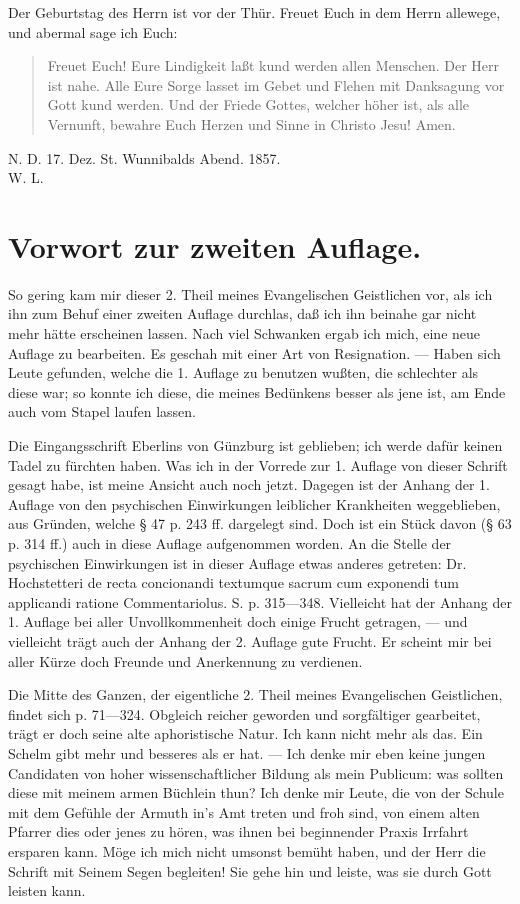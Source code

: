 Der Geburtstag des Herrn ist vor der Thür. Freuet Euch in dem Herrn allewege, und abermal sage ich Euch:

\begin{quote}
Freuet Euch! Eure Lindigkeit laßt kund werden allen Menschen. Der Herr ist nahe. Alle Eure Sorge lasset im Gebet und Flehen mit Danksagung vor Gott kund werden. Und der Friede Gottes, welcher höher ist, als alle Vernunft, bewahre Euch Herzen und Sinne in Christo Jesu! Amen.
\end{quote}

\begin{flushright}
N. D. 17. Dez. St. Wunnibalds Abend. 1857.\\[0.8em]
W. L.
\end{flushright}

\section*{Vorwort zur zweiten Auflage.}

So gering kam mir dieser 2. Theil meines Evangelischen Geistlichen vor, als ich ihn zum Behuf einer zweiten Auflage durchlas, daß ich ihn beinahe gar nicht mehr hätte erscheinen lassen. Nach viel Schwanken ergab ich mich, eine neue Auflage zu bearbeiten. Es geschah mit einer Art von Resignation. — Haben sich Leute gefunden, welche die 1. Auflage zu benutzen wußten, die schlechter als diese war; so konnte ich diese, die meines Bedünkens besser als jene ist, am Ende auch vom Stapel laufen lassen.

Die Eingangsschrift Eberlins von Günzburg ist geblieben; ich werde dafür keinen Tadel zu fürchten haben. Was ich in der Vorrede zur 1. Auflage von dieser Schrift gesagt habe, ist meine Ansicht auch noch jetzt. Dagegen ist der Anhang der 1. Auflage von den psychischen Einwirkungen leiblicher Krankheiten weggeblieben, aus Gründen, welche § 47 p. 243 ff. dargelegt sind. Doch ist ein Stück davon (§ 63 p. 314 ff.) auch in diese Auflage aufgenommen worden. An die Stelle der psychischen Einwirkungen ist in dieser Auflage etwas
anderes getreten: Dr. Hochstetteri de recta concionandi textumque sacrum cum exponendi tum applicandi ratione Commentariolus. S. p. 315—348. Vielleicht hat der Anhang der 1. Auflage bei aller Unvollkommenheit doch einige Frucht getragen, — und vielleicht trägt auch der Anhang der 2. Auflage gute Frucht. Er scheint mir bei aller Kürze doch Freunde und Anerkennung zu verdienen.

Die Mitte des Ganzen, der eigentliche 2. Theil meines Evangelischen Geistlichen, findet sich p. 71—324. Obgleich reicher geworden und sorgfältiger gearbeitet, trägt er doch seine alte aphoristische Natur. Ich kann nicht mehr als das. Ein Schelm gibt mehr und besseres als er hat. — Ich denke mir eben keine jungen Candidaten von hoher wissenschaftlicher Bildung als mein Publicum: was sollten diese mit meinem armen Büchlein thun? Ich denke mir Leute, die von der Schule mit dem Gefühle der Armuth in’s Amt treten und froh sind, von einem alten Pfarrer dies oder jenes zu hören, was ihnen bei beginnender Praxis Irrfahrt ersparen kann. Möge ich mich nicht umsonst bemüht haben, und der Herr die Schrift mit Seinem Segen begleiten! Sie gehe hin und leiste, was sie durch Gott leisten kann.

